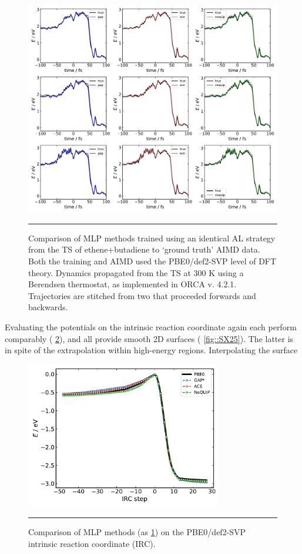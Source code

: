 \documentclass[11pt]{article}
\numberwithin{equation}{subsection}
\begin{document}
\begin{figure}[h!]
	\centering
	\includegraphics[width=\textwidth]{figSX23.pdf}
	\vspace{0.0cm}
	\hrule
	\vspace{0.1cm}
	\caption{Comparison of MLP methods trained using an identical AL strategy from the TS of ethene+butadiene to `ground truth' AIMD data. Both the training and AIMD used the PBE0/def2-SVP level of DFT theory. Dynamics propagated from the TS at 300 K using a Berendsen thermostat, as implemented in ORCA v. 4.2.1. Trajectories are stitched from two that proceeded forwards and backwards.}
	\label{fig::SX23}
\end{figure}


Evaluating the potentials on the intrinsic reaction coordinate again each perform comparably (\figurename{ \ref{fig::SX24}}), and all provide smooth 2D surfaces (\figurename{ \ref{fig::SX25}}). The latter is in spite of the extrapolation within high-energy regions. Interpolating the surface 


\begin{figure}[h!]
	\centering
	\includegraphics[height=6.4cm]{figSX24.pdf}
	\vspace{0.0cm}
	\hrule
	\vspace{0.1cm}
	\caption{Comparison of MLP methods (as \figurename{ \ref{fig::SX23}}) on the PBE0/def2-SVP intrinsic reaction coordinate (IRC).}
	\label{fig::SX24}
\end{figure}
\end{document}
